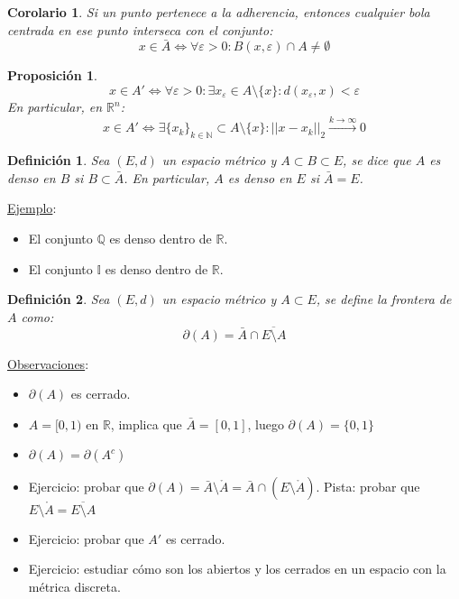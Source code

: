 \documentclass[10pt,a4paper,openright]{book}
\theoremstyle{break}
\newtheorem*{defi}{Definición}
\newtheorem*{coro}{Corolario}
\newtheorem*{prop}{Proposición}
\begin{document}
\begin{coro}
Si un punto pertenece a la adherencia, entonces cualquier bola centrada en ese punto interseca con el conjunto:
$$x\in \bar{A}\Leftrightarrow \forall \varepsilon >0: B(x,\varepsilon)\cap A \neq \emptyset$$
\end{coro}

\begin{prop}
$$x\in A' \Leftrightarrow \forall \varepsilon > 0: \exists x_{\varepsilon} \in A\setminus\{x\}: d(x_\varepsilon, x)< \varepsilon$$
En particular, en $\mathbb{R}^{n}$:
$$x\in A' \Leftrightarrow \exists \{x_k\}_{k\in \mathbb N}\subset A\setminus\{x\}: ||x-x_k||_{2}\xrightarrow{k\rightarrow\infty} 0$$
\end{prop}

\begin{defi}
Sea $(E,d)$ un espacio métrico y $A\subset B \subset E$, se dice que $A$ es denso en $B$ si $B\subset \bar{A}$. En particular, $A$ es denso en $E$ si $\bar{A} = E$.
\end{defi}

\underline{Ejemplo}:
\begin{itemize}
\item El conjunto $\mathbb{Q}$ es denso dentro de $\mathbb{R}$.
\item El conjunto $\mathbb{I}$ es denso dentro de $\mathbb{R}$.
\end{itemize}

\begin{defi}
Sea $(E,d)$ un espacio métrico y $A\subset E$, se define la frontera de $A$ como:
$$\partial(A) = \bar{A}\cap \overline{E\setminus{A}}$$
\end{defi}

\underline{Observaciones}:

\begin{itemize}
\item $\partial(A)$ es cerrado.
\item $A=[0,1)$ en $\mathbb{R}$, implica que $\bar{A} = [0,1]$, luego $\partial(A) = \{0,1\}$
\item $\partial(A) = \partial(A^c)$
\item Ejercicio: probar que $\partial(A)=\bar{A}\setminus{\mathring{A}} = \bar{A}\cap (E\setminus{\mathring{A}})$. Pista: probar que $E\setminus{{\mathring{A}}} = \overline{E\setminus{A}}$
\item Ejercicio: probar que $A'$ es cerrado.
\item Ejercicio: estudiar cómo son los abiertos y los cerrados en un espacio con la métrica discreta.
\end{itemize}
\end{document}
